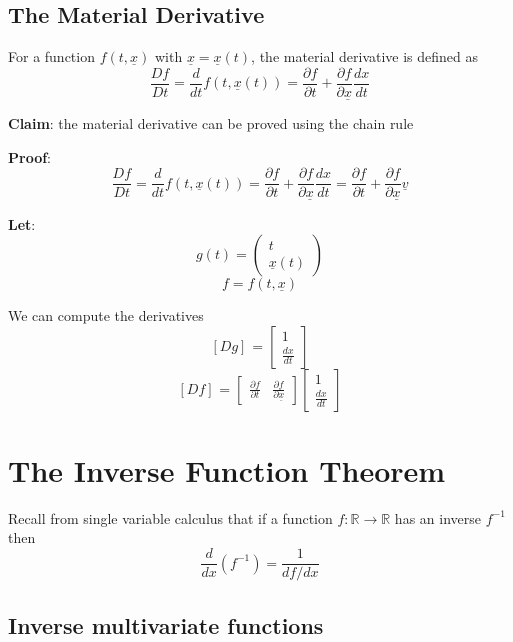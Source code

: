 \subsection{The Material Derivative}
\begin{framed}
   For a function $f(t, \underline{x})$ with $ \underline{x} = \underline{x}(t)$, the material derivative is defined as \[
     \frac{Df}{Dt} = \frac{d}{dt} f(t, \underline{x}(t)) = \frac{\partial f}{\partial t} + \frac{\partial f}{\partial \underline{x}} \frac{dx}{dt}
   \] 
\end{framed}

\textbf{Claim}: the material derivative can be proved using the chain rule

\textbf{Proof}: \[
     \frac{Df}{Dt} = \frac{d}{dt} f(t, \underline{x}(t)) = \frac{\partial f}{\partial t} + \frac{\partial f}{\partial \underline{x}} \frac{dx}{dt} = \frac{\partial f}{\partial t} + \frac{\partial f}{\partial \underline{x}} \underline{v}
   \] 

\textbf{Let}:
\[
  g(t) = \begin{pmatrix} t \\ \underline{x}(t) \end{pmatrix} 
\] 
\[
  f = f(t, \underline{x})
\] 

We can compute the derivatives \[
  \left[ D g \right]_{} = \begin{bmatrix} 
    1 \\ \frac{dx}{dt}   
  \end{bmatrix}
\] 
\[
 \left[ D f \right]_{} = \begin{bmatrix} 
    \frac{\partial f}{\partial t} & \frac{\partial f}{\partial \underline{x}}  
 \end{bmatrix}
 \begin{bmatrix} 
   1 \\ \frac{dx}{dt}  
 \end{bmatrix}
\] 

\section{The Inverse Function Theorem}
Recall from single variable calculus that if a function $f: \mathbb{R} \to \mathbb{R}$ has an inverse $f^{-1}$ then  \[
   \frac{d}{dx}(f^{-1}) = \frac{1}{df / dx}
\] 

\subsection{Inverse multivariate functions}

